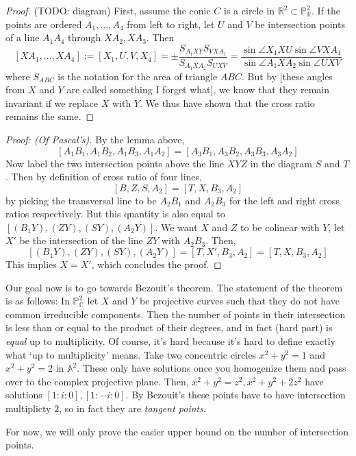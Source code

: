 \documentclass[12pt]{article}
\newcommand{\C}{\mathbb{C}}
\newcommand{\R}{\mathbb{R}}
\renewcommand{\P}{\mathbb{P}}
\newcommand{\A}{\mathbb{A}}
\begin{document}
    \begin{proof}
        (TODO: diagram) First, assume the conic $C$ is a circle in $\R^2 \subset \P_\R^2$. If the points are ordered $A_1, \dots, A_4$ from left to right, let $U$ and $V$ be intersection points of a line $A_1A_4$ through $XA_2, XA_3$. Then
        $$[XA_1, \dots, XA_4] := [X_1, U, V, X_4] = \pm \frac{S_{A_1XY} S_{VXA_1}}{S_{A_1XA_2}S_{UXV}} = \frac{\sin \angle X_1XU \sin \angle VXA_1}{\sin \angle A_1XA_2 \sin \angle UXV}$$
        where $S_{ABC}$ is the notation for the area of triangle $ABC$. But by [these angles from $X$ and $Y$ are called something I forget what], we know that they remain invariant if we replace $X$ with $Y$. We thus have shown that the cross ratio remains the same. 
    \end{proof}
    \begin{proof}
        [Proof: (Of Pascal's)] By the lemma above, 
        $$[A_1B_1, A_1B_2, A_1B_3, A_1A_2] = [A_3B_1, A_3B_2, A_3B_3, A_3A_2]$$
        Now label the two intersection points above the line $XYZ$ in the diagram $S$ and $T$. Then by definition of cross ratio of four lines, 
        $$[B, Z, S, A_2] = [T, X, B_3, A_2]$$
        by picking the transversal line to be $A_2B_1$ and $A_2B_3$ for the left and right cross ratios respectively. But this quantity is also equal to $[(B_1Y), (ZY), (SY), (A_2Y)]$. We want $X$ and $Z$ to be colinear with $Y$, let $X'$ be the intersection of the line $ZY$ with $A_2B_3$. Then, 
        $$[(B_1Y), (ZY), (SY), (A_2Y)] = [T, X', B_3, A_2] = [T, X, B_3, A_2]$$
        This implies $X = X'$, which concludes the proof. 
    \end{proof}
    Our goal now is to go towards Bezouit's theorem. The statement of the theorem is as follows: In $\P_\C^2$ let $X$ and $Y$ be projective curves such that they do not have common irreducible components. Then the number of points in their intersection is less than or equal to the product of their degrees, and in fact (hard part) is \textit{equal} up to multiplicity. Of course, it's hard because it's hard to define exactly what `up to multiplicity' means. Take two concentric circles $x^2 + y^2 = 1$ and $x^2 + y^2 = 2$ in $\A^2$. These only have solutions once you homogenize them and pass over to the complex projective plane. Then, $x^2 + y^2 = z^2, x^2 + y^2 + 2z^2$ have solutions $[1:i:0], [1:-i:0]$. By Bezouit's these points have to have intersection multiplicty $2$, so in fact they are \textit{tangent points}. \par 
    For now, we will only prove the easier upper bound on the number of intersection points. 
\end{document}
